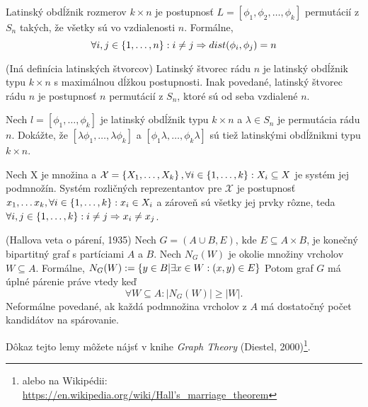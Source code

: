 \begin{definition}
Latinský obdĺžnik rozmerov $k \times n$ je postupnosť $L = [\phi_1, \phi_2, \ldots, \phi_k]$ permutácií z $S_n$ takých, že všetky sú vo vzdialenosti $n$. 
Formálne, 
$$\forall i, j \in \left\{1, \ldots, n\right\}: i \neq j \Rightarrow dist(\phi_i, \phi_j) = n$$
\end{definition}

\begin{definition}{(Iná definícia latinských štvorcov)}
Latinský štvorec rádu $n$ je latinský obdĺžnik typu $k \times n$ s maximálnou dĺžkou postupnosti. 
Inak povedané, latinský štvorec rádu $n$ je postupnosť $n$ permutácií z $S_n$, ktoré sú od seba vzdialené $n$.
\end{definition}


\begin{exercise}
Nech $l = [\phi_1, \ldots, \phi_k]$ je latinský obdĺžnik typu $k \times n$ a $\lambda \in S_n$ je permutácia rádu $n$.
Dokážte, že $[\lambda \phi_1, \ldots, \lambda \phi_k]$ a $[\phi_1 \lambda, \ldots, \phi_k \lambda]$ sú tiež latinskými obdĺžnikmi typu $k \times n$.
\end{exercise}


\begin{definition}
Nech X je množina a $\mathcal{X} = \left\{X_1, \ldots, X_k\right\}, \forall i \in \left\{1, \ldots, k\right\}: X_i \subseteq X$ je systém jej podmnožín.
Systém rozličných reprezentantov pre $\mathcal{X}$ je postupnosť $x_1, \ldots x_k, \forall i \in \left\{1, \ldots, k\right\}: x_i \in X_i$ 
a zároveň sú všetky jej prvky rôzne, teda $\forall i, j \in \left\{1, \ldots, k\right\}: i \neq j \Rightarrow  x_i \neq x_j$.
\end{definition}

\begin{lemma}{(Hallova veta o párení, 1935)}
Nech $G = (A \cup B, E)$, kde $E \subseteq A \times B$, je konečný bipartitný graf s partíciami $A$ a $B$.
Nech $N_G(W)$ je okolie množiny vrcholov $W \subseteq A$.
Formálne, $N_G(W) := \left\{y \in B| \exists x \in W: (x, y) \in E\right\} $
Potom graf $G$ má úplné párenie práve vtedy keď $$\forall W \subseteq A: |N_G(W)| \geq |W|.$$
Neformálne povedané, ak každá podmnožina vrcholov z $A$ má dostatočný počet kandidátov na spárovanie.
\end{lemma}
Dôkaz tejto lemy môžete nájsť v knihe \emph{Graph Theory} (Diestel, 2000)\footnote{alebo na Wikipédii: \href{https://en.wikipedia.org/wiki/Hall\%27s_marriage_theorem}{https://en.wikipedia.org/wiki/Hall's\_marriage\_theorem}}.

